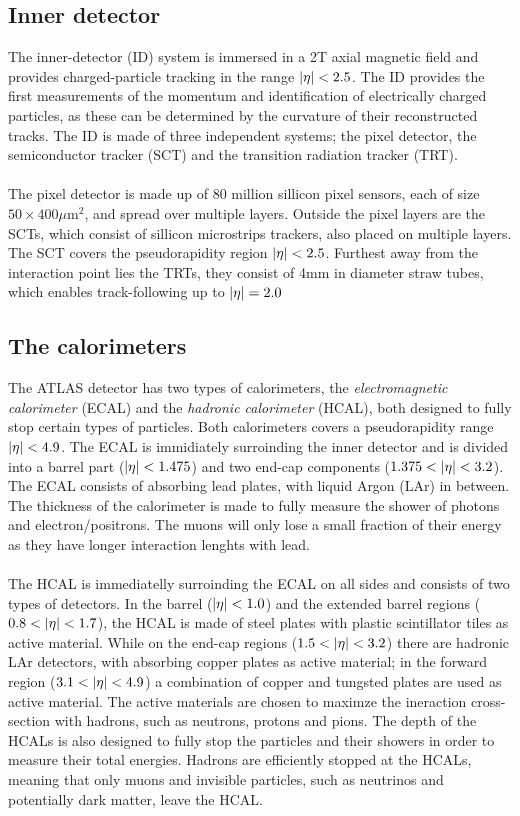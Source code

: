 \documentclass[14pt, a4paper]{book}
\begin{document}
\subsection{Inner detector}\label{sec:ID} 
The inner-detector (ID) system is immersed in a 2T axial magnetic field and provides charged-particle tracking in the range $\abs{\eta}<2.5$. The ID provides the first measurements of the 
momentum and identification of electrically charged particles, as these can be determined by the curvature of their reconstructed tracks. 
The ID is made of three independent systems; the pixel detector, the semiconductor tracker (SCT) and 
the transition radiation tracker (TRT). \\
\\The pixel detector is made up of 80 million sillicon pixel sensors, each of size $50\times400\mu$m$^2$, %
and spread over multiple layers. Outside the pixel layers 
are the SCTs, which consist of sillicon microstrips trackers, also placed on multiple layers. The SCT covers the pseudorapidity region $\abs{\eta}<2.5$. Furthest away from the interaction point lies the TRTs, 
they consist of 4mm in diameter straw tubes, which enables track-following up to $\abs{\eta}=2.0$ 

\subsection{The calorimeters}\label{sec:calories}
The ATLAS detector has two types of calorimeters, the \textit{electromagnetic calorimeter} (ECAL) and the \textit{hadronic calorimeter} (HCAL), both designed to fully stop certain types of particles. 
Both calorimeters covers a pseudorapidity range $\abs{\eta}<4.9$. The ECAL is immidiately surroinding the inner detector and is divided into a barrel part ($\abs{\eta}<1.475$) and two end-cap components ($1.375<\abs{\eta}<3.2$). 
The ECAL consists of absorbing lead plates, with liquid Argon (LAr) in between. The thickness of the calorimeter is made to fully measure the shower of photons and electron/positrons. The muons will only lose 
a small fraction of their energy as they have longer interaction lenghts with lead.\\
\\The HCAL is immediatelly surroinding the ECAL on all sides and consists of two types of detectors. In the barrel ($\abs{\eta}<1.0$) and the extended barrel regions ($0.8<\abs{\eta}<1.7$), the HCAL is made of 
steel plates with plastic scintillator tiles as active material. While on the end-cap regions ($1.5<\abs{\eta}<3.2$) there are hadronic LAr detectors, with absorbing copper plates as active material; in the 
forward region ($3.1<\abs{\eta}<4.9$) a combination of copper and tungsted plates are used as active material. The active materials are chosen to maximze the ineraction cross-section with hadrons, such as neutrons, 
protons and pions. The depth of the HCALs is also designed to fully stop the particles and their showers in order to measure their total energies. Hadrons are efficiently stopped at the HCALs, meaning that only 
muons and invisible particles, such as neutrinos and potentially dark matter, leave the HCAL.
\end{document}
